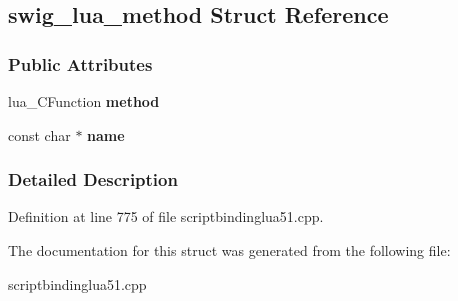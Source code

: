 \hypertarget{structswig__lua__method}{
\subsection{swig\_\-lua\_\-method Struct Reference}
\label{structswig__lua__method}
}
\subsubsection*{Public Attributes}
\begin{DoxyCompactItemize}
\item 
\hypertarget{structswig__lua__method_acd3407541fc11f75433c4525b6be1c80}{
lua\_\-CFunction {\bfseries method}}
\label{structswig__lua__method_acd3407541fc11f75433c4525b6be1c80}

\item 
\hypertarget{structswig__lua__method_a07924dac2528f3bc8585918c2ced8856}{
const char $\ast$ {\bfseries name}}
\label{structswig__lua__method_a07924dac2528f3bc8585918c2ced8856}

\end{DoxyCompactItemize}


\subsubsection{Detailed Description}


Definition at line 775 of file scriptbindinglua51.cpp.



The documentation for this struct was generated from the following file:\begin{DoxyCompactItemize}
\item 
scriptbindinglua51.cpp\end{DoxyCompactItemize}
